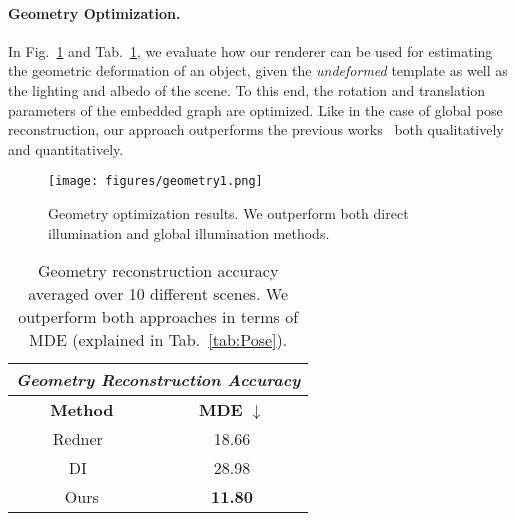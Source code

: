 \paragraph{Geometry Optimization.}
%
In Fig.~\ref{fig:geometry} and Tab.~\ref{tab:Geometry}, we evaluate how our renderer can be used for estimating the geometric deformation of an object, given the \textit{undeformed} template as well as the lighting and albedo of the scene.
%
To this end, the rotation and translation parameters of the embedded graph are optimized.
%
Like in the case of global pose reconstruction, our approach outperforms the previous works~\cite{li2018differentiable, ravi2020pytorch3d} both qualitatively and quantitatively.
%
%
\begin{figure}
	\texttt{[image: figures/geometry1.png]} 
	\caption
	{
		Geometry optimization results. 
		We outperform both direct illumination and global illumination methods.
	}
	\label{fig:geometry}
\end{figure}
%
%
\begin{table}
	\begin{center}
		\begin{tabular}{|c|c|}
			\hline
			\multicolumn{2}{|c|}{\textit{Geometry Reconstruction Accuracy}} \\
			\hline
			\textbf{Method}                                             & \textbf{MDE}  $\downarrow$    		  \\
			\hline
			Redner~\cite{li2018differentiable}							& 18.66		                  	   	              \\
			DI~\cite{ravi2020pytorch3d} 							    & 28.98	                           		          \\
			\hline
			Ours    									   	            & \textbf{11.80}	                    	          \\
			\hline
		\end{tabular}
	\end{center}
	\caption
	{
		Geometry reconstruction accuracy averaged over 10 different scenes.
		We outperform both approaches in terms of MDE (explained in Tab.~\ref{tab:Pose}).
	}
	\label{tab:Geometry}
\end{table}
%
%
%
